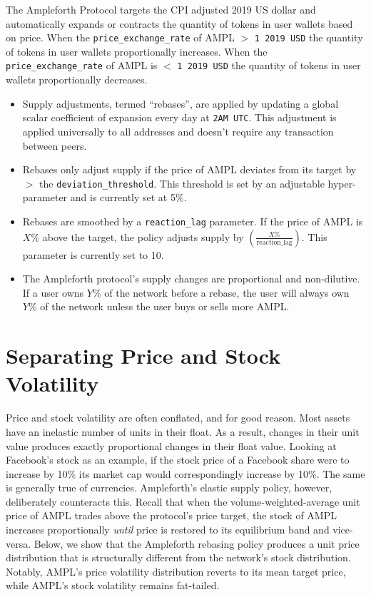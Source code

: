 \documentclass[11pt]{article}
\begin{document}
The Ampleforth Protocol targets the CPI adjusted 2019 US dollar and automatically expands
or contracts the quantity of tokens in user wallets based on price. When the
\texttt{price\_exchange\_rate} of AMPL $>$ \texttt{1 2019 USD} the quantity of tokens in user
wallets proportionally increases. When the \texttt{price\_exchange\_rate} of AMPL is $<$
\texttt{1 2019 USD} the quantity of tokens in user wallets proportionally decreases.

\begin{itemize}
  \item Supply adjustments, termed ``rebases'', are applied by updating a global scalar
    coefficient of expansion every day at \texttt{2AM UTC}. This adjustment is applied
    universally to all addresses and doesn't require any transaction between peers.
  \item Rebases only adjust supply if the price of AMPL deviates from its target by $>$ the
    \texttt{deviation\_threshold}. This threshold is set by an adjustable hyper-parameter and
    is currently set at 5\%.
  \item Rebases are smoothed by a \texttt{reaction\_lag} parameter. If the price of AMPL is
    $X\%$ above the target, the policy adjusts supply by
    $\left(\frac{X\%}{\text{reaction\_lag}}\right)$. This parameter is currently set to 10.
  \item The Ampleforth protocol's supply changes are proportional and non-dilutive. If a user
    owns $Y\%$ of the network before a rebase, the user will always own $Y\%$ of the network
    unless the user buys or sells more AMPL.
\end{itemize}

\section{Separating Price and Stock Volatility}

Price and stock volatility are often conflated, and for good reason. Most assets have an
inelastic number of units in their float. As a result, changes in their unit value produces
exactly proportional changes in their float value. Looking at Facebook's stock as an example,
if the stock price of a Facebook share were to increase by 10\% its market cap would
correspondingly increase by 10\%. The same is generally true of currencies. Ampleforth's
elastic supply policy, however, deliberately counteracts this. Recall that when the
volume-weighted-average unit price of AMPL trades above the protocol's price target, the stock
of AMPL increases proportionally \emph{until} price is restored to its equilibrium band and
vice-versa. Below, we show that the Ampleforth rebasing policy produces a unit price
distribution that is structurally different from the network's stock distribution. Notably,
AMPL's price volatility distribution reverts to its mean target price, while AMPL's stock
volatility remains fat-tailed.
\end{document}
